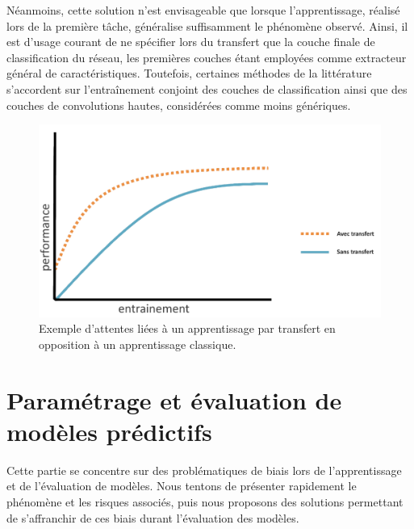 Néanmoins, cette solution n’est envisageable que lorsque l’apprentissage, réalisé lors de la première tâche, généralise suffisamment le phénomène observé. Ainsi, il est d’usage courant de ne spécifier lors du transfert que la couche finale de classification du réseau, les premières couches étant employées comme extracteur général de caractéristiques. Toutefois, certaines méthodes de la littérature s’accordent sur l'entraînement conjoint des couches de classification ainsi que des couches de convolutions hautes, considérées comme moins génériques.\par

\begin{figure}[H]
    \centering
    \includegraphics[width=\linewidth]{contents/chapter_3/resources/example_learning_curves.pdf}
    \caption{Exemple d'attentes liées à un apprentissage par transfert en opposition à un apprentissage classique.}
    \label{fig:learning_curves}
\end{figure}

\clearpage

\section{Paramétrage et évaluation de modèles prédictifs}
\label{sec:models_settings}
Cette partie se concentre sur des problématiques de biais lors de l'apprentissage et de l'évaluation de modèles. Nous tentons de présenter rapidement le phénomène et les risques associés, puis nous proposons des solutions permettant de s'affranchir de ces biais durant l'évaluation des modèles.\par

